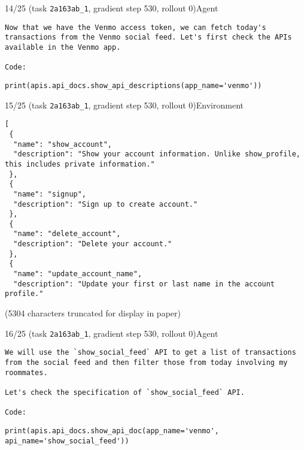 \begin{minipage}{0.95\linewidth}
\begin{assistant_message_box}{{14/25 (task \texttt{2a163ab\_1}, gradient step 530, rollout 0)\hfill Agent}}
\scriptsize
\begin{Verbatim}[breaklines]
Now that we have the Venmo access token, we can fetch today's transactions from the Venmo social feed. Let's first check the APIs available in the Venmo app.

Code:
\end{Verbatim}
\begin{tcolorbox}[colback=codebgcolor,boxrule=0pt]\begin{Verbatim}[breaklines]
print(apis.api_docs.show_api_descriptions(app_name='venmo'))
\end{Verbatim}
\end{tcolorbox}\end{assistant_message_box}
\end{minipage}

\hspace*{8mm}%
\begin{minipage}{0.95\linewidth}
\begin{user_message_box}{{15/25 (task \texttt{2a163ab\_1}, gradient step 530, rollout 0)\hfill Environment}}
\scriptsize
\begin{Verbatim}[breaklines]
[
 {
  "name": "show_account",
  "description": "Show your account information. Unlike show_profile, this includes private information."
 },
 {
  "name": "signup",
  "description": "Sign up to create account."
 },
 {
  "name": "delete_account",
  "description": "Delete your account."
 },
 {
  "name": "update_account_name",
  "description": "Update your first or last name in the account profile."
\end{Verbatim}
(5304 characters truncated for display in paper)\end{user_message_box}
\end{minipage}

\begin{minipage}{0.95\linewidth}
\begin{assistant_message_box}{{16/25 (task \texttt{2a163ab\_1}, gradient step 530, rollout 0)\hfill Agent}}
\scriptsize
\begin{Verbatim}[breaklines]
We will use the `show_social_feed` API to get a list of transactions from the social feed and then filter those from today involving my roommates. 

Let's check the specification of `show_social_feed` API.

Code:
\end{Verbatim}
\begin{tcolorbox}[colback=codebgcolor,boxrule=0pt]\begin{Verbatim}[breaklines]
print(apis.api_docs.show_api_doc(app_name='venmo', api_name='show_social_feed'))
\end{Verbatim}
\end{tcolorbox}\end{assistant_message_box}
\end{minipage}

